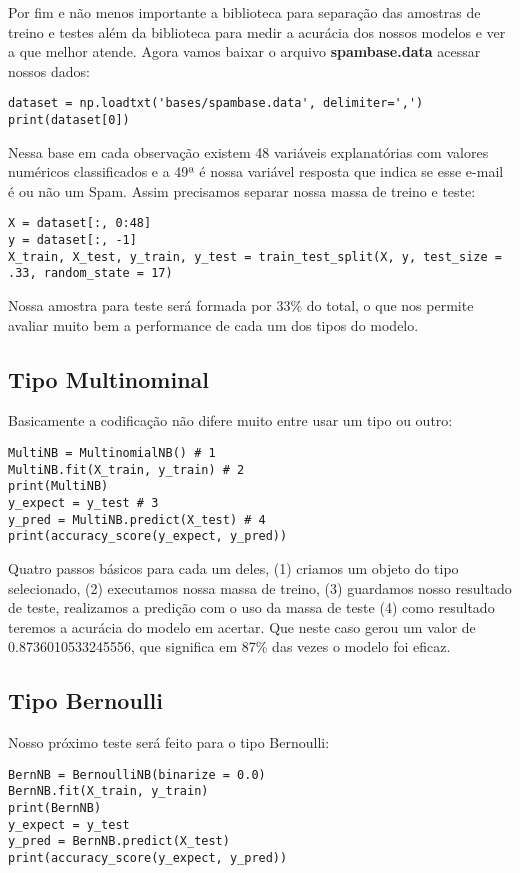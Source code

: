 Por fim e não menos importante a biblioteca para separação das amostras de treino e testes além da biblioteca para medir a acurácia dos nossos modelos e ver a que melhor atende. Agora vamos baixar o arquivo \textbf{spambase.data} acessar nossos dados:
\begin{lstlisting}[]
dataset = np.loadtxt('bases/spambase.data', delimiter=',')
print(dataset[0])
\end{lstlisting}

Nessa base em cada observação existem 48 variáveis explanatórias com valores numéricos classificados e a 49ª é nossa variável resposta que indica se esse e-mail é ou não um Spam. Assim precisamos separar nossa massa de treino e teste:
\begin{lstlisting}[]
X = dataset[:, 0:48]
y = dataset[:, -1]
X_train, X_test, y_train, y_test = train_test_split(X, y, test_size = .33, random_state = 17)
\end{lstlisting}

Nossa amostra para teste será formada por 33\% do total, o que nos permite avaliar muito bem a performance de cada um dos tipos do modelo.

\subsection{Tipo Multinominal}
Basicamente a codificação não difere muito entre usar um tipo ou outro:
\begin{lstlisting}[]
MultiNB = MultinomialNB() # 1
MultiNB.fit(X_train, y_train) # 2
print(MultiNB)
y_expect = y_test # 3
y_pred = MultiNB.predict(X_test) # 4
print(accuracy_score(y_expect, y_pred))
\end{lstlisting}

Quatro passos básicos para cada um deles, (1) criamos um objeto do tipo selecionado, (2) executamos nossa massa de treino, (3) guardamos nosso resultado de teste, realizamos a predição com o uso da massa de teste (4) como resultado teremos a acurácia do modelo em acertar. Que neste caso gerou um valor de 0.8736010533245556, que significa em 87\% das vezes o modelo foi eficaz.

\subsection{Tipo Bernoulli}
Nosso próximo teste será feito para o tipo Bernoulli:
\begin{lstlisting}[]
BernNB = BernoulliNB(binarize = 0.0)
BernNB.fit(X_train, y_train)
print(BernNB)
y_expect = y_test
y_pred = BernNB.predict(X_test)
print(accuracy_score(y_expect, y_pred))
\end{lstlisting}

